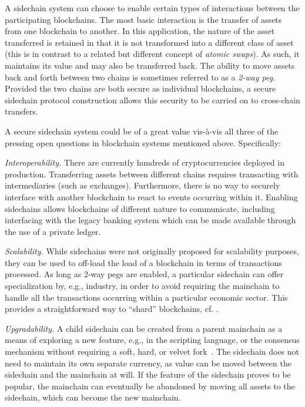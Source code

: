 A sidechain system can choose to enable certain types of interactions between
the participating block\-chains. The most basic interaction
is the transfer of assets from
one blockchain to another. In this application, the nature of the asset
transferred is retained in that it is not transformed into a different class of
asset (this is in contrast to a related but different concept of \emph{atomic
swaps}).
As such, it maintains its value and may also be transferred back.
The ability to move assets back and
forth between two chains is sometimes referred to as a \textit{2-way peg}. Provided
the two chains are both secure as individual blockchains, a secure
sidechain protocol construction allows this security to be carried on to
cross-chain transfers.

A secure sidechain system could be of a great value vis-\`a-vis all three
of the pressing open questions in blockchain systems mentioned above. Specifically:

{\em Interoperability.} There are currently hundreds of
    cryptocurrencies deployed in production. Transferring assets between
    different chains requires transacting with intermediaries (such as exchanges). Furthermore,
    there is no way to securely interface with another blockchain to react to
    events occurring within it. Enabling sidechains allows
    blockchains of different nature to communicate, including interfacing with
    the legacy banking system which can be made available through the use of
    a private ledger.

{\em   Scalability.} While sidechains were not originally proposed for
    scalability purposes, they can be used to off-load the load of a blockchain
    in terms of transactions processed. As long as 2-way pegs are enabled, a
    particular sidechain can offer specialization by, e.g., industry, in order
    to avoid requiring the mainchain to handle all the transactions occurring
    within a particular economic sector. This provides a straightforward way to
    ``shard'' blockchains, cf. \cite{sharding,omniledger,rapidchain}.

{\em Upgradability.} A child sidechain can be created from a parent
    mainchain as a means of exploring a new feature, e.g., in the scripting language, or
    the consensus mechanism
    without requiring a soft, hard, or velvet fork~\cite{nipopows,velvet}. The
    sidechain does not need to maintain its own separate currency, as value can
    be moved between the sidechain and the mainchain at will. If the feature of
    the sidechain proves to be popular, the mainchain can eventually be
    abandoned by moving all assets to the sidechain, which can become the new
    mainchain.

